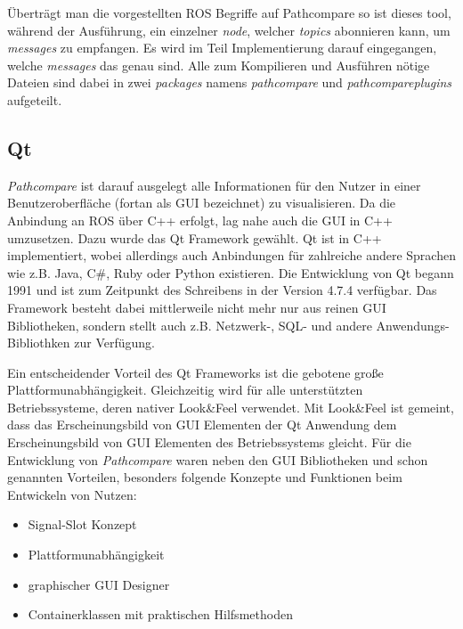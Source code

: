 Überträgt man die vorgestellten ROS Begriffe auf Pathcompare so ist
dieses tool, während der Ausführung,
ein einzelner \textit{node}, welcher \textit{topics} abonnieren kann, um
\textit{messages} zu empfangen. Es wird im Teil Implementierung darauf
eingegangen, welche \textit{messages} das genau sind. Alle zum Kompilieren und
Ausführen nötige Dateien sind dabei in zwei \textit{packages} namens
\textit{pathcompare} und \textit{pathcompareplugins} aufgeteilt.

\subsection{Qt}

\textit{Pathcompare} ist darauf ausgelegt alle Informationen für den Nutzer in
einer Benutzeroberfläche (fortan als GUI bezeichnet) zu visualisieren.
Da die Anbindung an ROS über C++ erfolgt, lag nahe auch die GUI in C++
umzusetzen. Dazu wurde das Qt Framework gewählt. Qt ist in C++ implementiert, wobei
allerdings auch Anbindungen für zahlreiche andere Sprachen wie z.B.
Java, C\#, Ruby oder Python existieren. Die Entwicklung von Qt begann 1991 und
ist zum Zeitpunkt des Schreibens in der Version 4.7.4 verfügbar. Das Framework besteht dabei
mittlerweile nicht mehr nur aus reinen GUI Bibliotheken, sondern stellt auch
z.B. Netzwerk-, SQL- und andere Anwendungs-Bibliothken zur Verfügung.

Ein entscheidender Vorteil des Qt Frameworks ist die gebotene große
Plattformunabhängigkeit.  Gleichzeitig wird für alle unterstützten
Betriebssysteme, deren nativer Look\&Feel verwendet. Mit Look\&Feel
ist gemeint, dass das Erscheinungsbild von GUI Elementen der Qt Anwendung
dem Erscheinungsbild von GUI Elementen des Betriebssystems gleicht.  Für die
Entwicklung von \textit{Pathcompare} waren neben den GUI Bibliotheken und schon
genannten Vorteilen, besonders folgende Konzepte und Funktionen beim Entwickeln
von Nutzen: 

\begin{itemize}
  \item Signal-Slot Konzept
  \item Plattformunabhängigkeit
  \item graphischer GUI Designer 
  \item Containerklassen mit praktischen Hilfsmethoden
\end{itemize}

